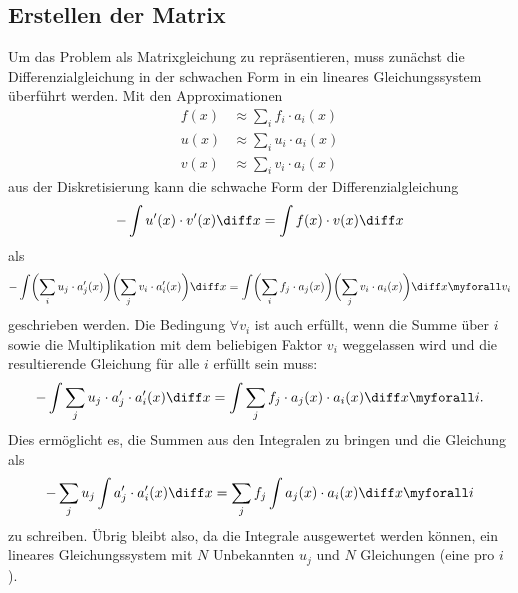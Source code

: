 \subsection{Erstellen der Matrix\label{fem:1d:matrix_erstellen}}
Um das Problem als Matrixgleichung zu repräsentieren, muss zunächst die Differenzialgleichung in der schwachen Form in ein lineares Gleichungssystem überführt werden.
Mit den Approximationen 
\begin{align}
    f(x) &\approx \sum_i f_i \cdot a_i(x) \\
    u(x) &\approx \sum_i u_i \cdot a_i(x) \\
    v(x) &\approx \sum_i v_i \cdot a_i(x)
\end{align}
aus der Diskretisierung kann die schwache Form der Differenzialgleichung 
\begin{equation}
    - \int u'(x) \cdot v'(x) \diff x = \int f(x) \cdot v(x) \diff x
\end{equation}
als
\begin{equation}
    - \int \biggl(\sum_i u_j \cdot a'_j(x)\biggr) \biggl(\sum_j v_i \cdot a'_i(x)\biggr) \diff x 
    = \int \biggl(\sum_i f_j \cdot a_j(x) \biggr) \biggl(\sum_j v_i \cdot a_i(x) \biggr) \diff x 
    \myforall v_i
\end{equation}
geschrieben werden.
Die Bedingung $\forall v_i$ ist auch erfüllt, wenn die Summe über $i$ sowie die Multiplikation mit dem beliebigen Faktor $v_i$ weggelassen wird und die resultierende Gleichung für alle $i$ erfüllt sein muss: %
\begin{equation}
    - \int \sum_j u_j \cdot a'_j \cdot a'_i(x) \diff x = \int \sum_j f_j \cdot a_j(x) \cdot a_i(x) \diff x \myforall i.
\end{equation}
Dies ermöglicht es, die Summen aus den Integralen zu bringen und die Gleichung als
\begin{equation}
    - \sum_j u_j \int a'_j \cdot a'_i(x) \diff x = \sum_j f_j \int a_j(x) \cdot a_i(x) \diff x \myforall i \label{papers:fem:prinzip1d:finale_gleichung}
\end{equation}
zu schreiben.
Übrig bleibt also, da die Integrale ausgewertet werden können, ein lineares Gleichungssystem mit $N$ Unbekannten $u_j$ und $N$ Gleichungen (eine pro $i$). 

